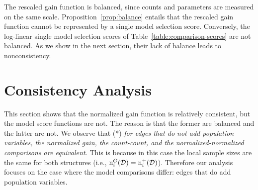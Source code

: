 \documentclass[letterpaper]{article}
\begin{document}
	\normalsize
	
	
	The rescaled gain function is balanced, since counts and parameters are measured on the same scale. Proposition~\ref{prop:balance} entails that the rescaled gain function cannot be represented by a single model selection score. Conversely, the log-linear single model selection scores of Table~\ref{table:comparison-scores} are not balanced. As we show in the next section, their lack of balance leads to nonconsistency.


\section{Consistency Analysis} \label{sec:theory}
This section shows that the normalized gain function is relatively consistent, but the model score functions are not. The reason is that the former are balanced and the latter are not. We observe that (*)  {\em for edges that do not add population variables, the normalized gain, the count-count, and the normalized-normalized comparisons are equivalent.}
 This is because in this case the local sample sizes are the same for both structures (i.e., $\mathrm{n}^{G}_{i}(\mathcal{D}) = \mathrm{n}^{+}_{i}(\mathcal{D})$). Therefore our analysis focuses on the case where the model comparisons differ: edges that do add population variables.
\end{document}
